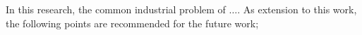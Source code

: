 In this research, the common industrial problem of $\ldots$. As extension to this work, the following points are recommended for the future work; 

